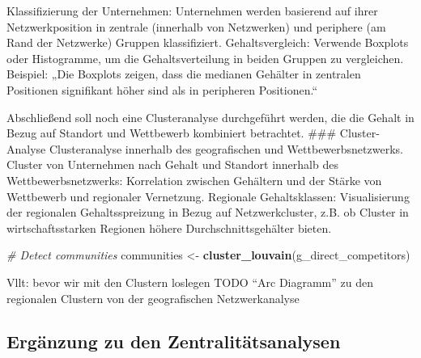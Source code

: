 \documentclass[
]{article}
\newenvironment{Shaded}{\begin{snugshade}}{\end{snugshade}}
\newcommand{\CommentTok}[1]{\textcolor[rgb]{0.56,0.35,0.01}{\textit{#1}}}
\newcommand{\FunctionTok}[1]{\textcolor[rgb]{0.13,0.29,0.53}{\textbf{#1}}}
\newcommand{\NormalTok}[1]{#1}
\newcommand{\OtherTok}[1]{\textcolor[rgb]{0.56,0.35,0.01}{#1}}
\begin{document}
Klassifizierung der Unternehmen: Unternehmen werden basierend auf ihrer
Netzwerkposition in zentrale (innerhalb von Netzwerken) und periphere
(am Rand der Netzwerke) Gruppen klassifiziert. Gehaltsvergleich:
Verwende Boxplots oder Histogramme, um die Gehaltsverteilung in beiden
Gruppen zu vergleichen. Beispiel: „Die Boxplots zeigen, dass die
medianen Gehälter in zentralen Positionen signifikant höher sind als in
peripheren Positionen.``

Abschließend soll noch eine Clusteranalyse durchgeführt werden, die die
Gehalt in Bezug auf Standort und Wettbewerb kombiniert betrachtet.
\#\#\# Cluster-Analyse Clusteranalyse innerhalb des geografischen und
Wettbewerbsnetzwerks. Cluster von Unternehmen nach Gehalt und Standort
innerhalb des Wettbewerbsnetzwerks: Korrelation zwischen Gehältern und
der Stärke von Wettbewerb und regionaler Vernetzung. Regionale
Gehaltsklassen: Visualisierung der regionalen Gehaltsspreizung in Bezug
auf Netzwerkcluster, z.B. ob Cluster in wirtschaftsstarken Regionen
höhere Durchschnittsgehälter bieten.

\begin{Shaded}
\begin{Highlighting}[]
\CommentTok{\# Detect communities}
\NormalTok{communities }\OtherTok{\textless{}{-}} \FunctionTok{cluster\_louvain}\NormalTok{(g\_direct\_competitors)}
\end{Highlighting}
\end{Shaded}

Vllt: bevor wir mit den Clustern loslegen TODO ``Arc Diagramm'' zu den
regionalen Clustern von der geografischen Netzwerkanalyse

\subsection{Ergänzung zu den
Zentralitätsanalysen}\label{erguxe4nzung-zu-den-zentralituxe4tsanalysen}
\end{document}
